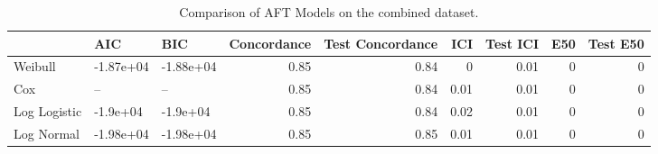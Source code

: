 \begin{table*}
\centering
\caption{Comparison of AFT Models on the combined dataset.}
\label{tab:combined}
\begin{tabular}{lllrrrrrr}
\toprule
 & AIC & BIC & Concordance & Test Concordance & ICI & Test ICI & E50 & Test E50 \\
\midrule
Weibull & -1.87e+04 & -1.88e+04 & 0.85 & 0.84 & 0 & 0.01 & 0 & 0 \\
Cox & -- & -- & 0.85 & 0.84 & 0.01 & 0.01 & 0 & 0 \\
Log Logistic & -1.9e+04 & -1.9e+04 & 0.85 & 0.84 & 0.02 & 0.01 & 0 & 0 \\
Log Normal & -1.98e+04 & -1.98e+04 & 0.85 & 0.85 & 0.01 & 0.01 & 0 & 0 \\
\bottomrule
\end{tabular}
\end{table*}
